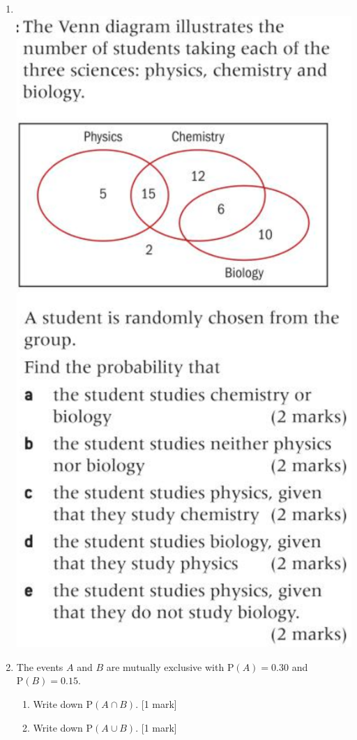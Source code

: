 \documentclass[12pt, twoside]{article}
\begin{document}
\begin{enumerate}
\newpage
\item \; \\
    \includegraphics[scale=0.5]{../graphics/problem15-p374.png} \vspace{2cm}

\item The events $A$ and $B$ are mutually exclusive with $\mathrm P(A)=0.30$ and $\mathrm P(B)=0.15$.
    \begin{enumerate}[itemsep=1.5cm]
        \item Write down $\mathrm P(A \cap B)$. \hfill [1 mark]
        \item Write down $\mathrm P(A \cup B)$. \hfill [1 mark]
    \end{enumerate}


\end{enumerate}
\end{document}
